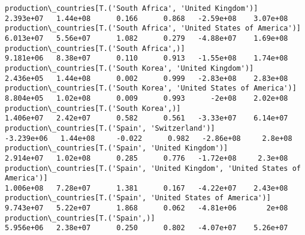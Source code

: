 \documentclass[11pt]{article}
\begin{document}
\begin{Verbatim}[commandchars=\\\{\}]
production\_countries[T.('South Africa', 'United Kingdom')]                                                                                                                             2.393e+07   1.44e+08      0.166      0.868   -2.59e+08    3.07e+08
production\_countries[T.('South Africa', 'United States of America')]                                                                                                                   6.013e+07   5.56e+07      1.082      0.279   -4.88e+07    1.69e+08
production\_countries[T.('South Africa',)]                                                                                                                                              9.181e+06   8.38e+07      0.110      0.913   -1.55e+08    1.74e+08
production\_countries[T.('South Korea', 'United Kingdom')]                                                                                                                              2.436e+05   1.44e+08      0.002      0.999   -2.83e+08    2.83e+08
production\_countries[T.('South Korea', 'United States of America')]                                                                                                                    8.804e+05   1.02e+08      0.009      0.993      -2e+08    2.02e+08
production\_countries[T.('South Korea',)]                                                                                                                                               1.406e+07   2.42e+07      0.582      0.561   -3.33e+07    6.14e+07
production\_countries[T.('Spain', 'Switzerland')]                                                                                                                                      -3.239e+06   1.44e+08     -0.022      0.982   -2.86e+08     2.8e+08
production\_countries[T.('Spain', 'United Kingdom')]                                                                                                                                    2.914e+07   1.02e+08      0.285      0.776   -1.72e+08     2.3e+08
production\_countries[T.('Spain', 'United Kingdom', 'United States of America')]                                                                                                        1.006e+08   7.28e+07      1.381      0.167   -4.22e+07    2.43e+08
production\_countries[T.('Spain', 'United States of America')]                                                                                                                          9.743e+07   5.22e+07      1.868      0.062   -4.81e+06       2e+08
production\_countries[T.('Spain',)]                                                                                                                                                     5.956e+06   2.38e+07      0.250      0.802   -4.07e+07    5.26e+07

\end{Verbatim}
\end{document}
